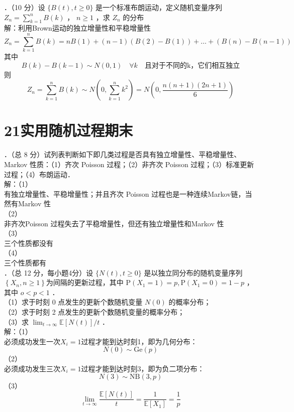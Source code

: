 \documentclass[UTF8,openany]{book}
\begin{document}
．（10 分）设 $\{B(t), t \geq 0\}$ 是一个标准布朗运动，定义随机变量序列 $Z_{n} = \sum_{k=1}^{n} B(k)$ ， $n \geq 1$ ，求 $Z_{n}$ 的分布\\
解：利用Brown运动的独立增量性和平稳增量性\\
\[
Z_{n} = \sum_{k=1}^{n} B(k)=nB(1)+(n-1)(B(2)-B(1))+\dots+(B(n)-B(n-1))
\]
其中
\[
B(k)-B(k-1) \sim N(0,1) \quad \forall k \quad \text{且对于不同的k，它们相互独立}
\]
则
\[
Z_{n} = \sum_{k=1}^{n} B(k) \sim N\left(0,\sum_{k=1}^{n} k^2\right) = N\left(0,\frac{n(n+1)(2n+1)}{6}\right)
\]
\newpage
\section{\centering 21实用随机过程期末}
．（总 8 分）试列表判断如下即几类过程是否具有独立增量性、平稳增量性、Markov 性质：（1）齐次 Poisson 过程；（2）非齐次 Poisson 过程；（3）标准更新过程；（4）布朗运动．\\
解：（1）\\
有独立增量性、平稳增量性；并且齐次 Poisson 过程也是一种连续Markov链，当然有Markov 性\\
（2）\\
非齐次Poisson 过程失去了平稳增量性，但还有独立增量性和Markov 性\\
（3）\\
三个性质都没有\\
（4）\\
三个性质都有\\



．（总 12 分，每小题4分）设 $\{N(t), t \geq 0\}$ 是以独立同分布的随机变量序列 $\left\{X_{n}, n \geq 1\right\}$为间隔的更新过程，其中 $\mathrm{P}\left(X_{1}=1\right)=p, \mathrm{P}\left(X_{1}=0\right)=1-p$ ，其中 $o<p<1$ ．\\
（1）求于时刻 0 点发生的更新个数随机变量 $N(0)$ 的概率分布；\\
（2）求于时刻 2 点发生的更新个数随机变量的概率分布；\\
（3）求 $\lim _{t \rightarrow \infty} \mathbb{E}[N(t)] / t$ ．\\
解：（1）\\
必须成功发生一次$X_i=1$过程才能到达时刻1，即为几何分布：
\[
N(0)\sim \mathrm{Ge}(p)
\]
（2）\\
必须成功发生三次$X_i=1$过程才能到达时刻3，即为负二项分布：
\[
N(3)\sim \mathrm{NB}(3,p)
\]
（3）\\
\[
\lim _{t \rightarrow \infty} \frac{\mathbb{E}[N(t)]}{t}=\frac{1}{\mathbb{E}[X_1]}=\frac{1}{p}
\]\\
\end{document}
